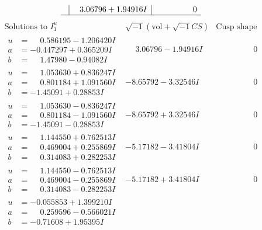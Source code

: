 \documentclass[1p]{elsarticle_modified}
\theoremstyle{definition}
\newcommand{\I}{\sqrt{-1}}
\begin{document}
$$\begin{array}{c|c|c}
 & \phantom{-}3.06796 + 1.94916 I & \phantom{-0.000000 } 0\\
 \hline 
 \end{array}$$\newpage$$\begin{array}{c|c|c}  
\text{Solutions to }I^u_{1}& \I (\text{vol} + \sqrt{-1}CS) & \text{Cusp shape}\\
 \hline 
\begin{aligned}
u &= \phantom{-}0.586195 - 1.206420 I \\
a &= -0.447297 + 0.365209 I \\
b &= \phantom{-}1.47980 - 0.94082 I\end{aligned}
 & \phantom{-}3.06796 - 1.94916 I & \phantom{-0.000000 } 0 \\ \hline\begin{aligned}
u &= \phantom{-}1.053630 + 0.836247 I \\
a &= \phantom{-}0.801184 + 1.091560 I \\
b &= -1.45091 + 0.28853 I\end{aligned}
 & -8.65792 - 3.32546 I & \phantom{-0.000000 } 0 \\ \hline\begin{aligned}
u &= \phantom{-}1.053630 - 0.836247 I \\
a &= \phantom{-}0.801184 - 1.091560 I \\
b &= -1.45091 - 0.28853 I\end{aligned}
 & -8.65792 + 3.32546 I & \phantom{-0.000000 } 0 \\ \hline\begin{aligned}
u &= \phantom{-}1.144550 + 0.762513 I \\
a &= \phantom{-}0.469004 + 0.255869 I \\
b &= \phantom{-}0.314083 + 0.282253 I\end{aligned}
 & -5.17182 - 3.41804 I & \phantom{-0.000000 } 0 \\ \hline\begin{aligned}
u &= \phantom{-}1.144550 - 0.762513 I \\
a &= \phantom{-}0.469004 - 0.255869 I \\
b &= \phantom{-}0.314083 - 0.282253 I\end{aligned}
 & -5.17182 + 3.41804 I & \phantom{-0.000000 } 0 \\ \hline\begin{aligned}
u &= -0.055853 + 1.399210 I \\
a &= \phantom{-}0.259596 - 0.566021 I \\
b &= -0.71608 + 1.95395 I\end{aligned}

\end{array}$$
\end{document}
